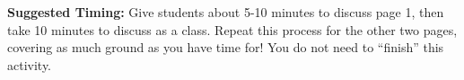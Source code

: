 \documentclass[noauthor,nooutcomes, handout]{ximera}
\begin{document}
\begin{instructorNotes}
{\bf Suggested Timing:} Give students about 5-10 minutes to discuss page 1, then take 10 minutes to discuss as a class. Repeat this process for the other two pages, covering as much ground as you have time for! You do not need to ``finish'' this activity.


\end{instructorNotes}
\end{document}
